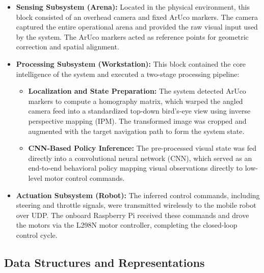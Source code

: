 \begin{itemize}
    \item \textbf{Sensing Subsystem (Arena):}
    Located in the physical environment, this block consisted of an overhead camera and fixed ArUco markers. The camera captured the entire operational arena and provided the raw visual input used by the system. The ArUco markers acted as reference points for geometric correction and spatial alignment.

    \item \textbf{Processing Subsystem (Workstation):}
    This block contained the core intelligence of the system and executed a two-stage processing pipeline:
    \begin{itemize}
        \item \textbf{Localization and State Preparation:}
        The system detected ArUco markers to compute a homography matrix, which warped the angled camera feed into a standardized top-down bird’s-eye view using inverse perspective mapping (IPM). The transformed image was cropped and augmented with the target navigation path to form the system state.

        \item \textbf{CNN-Based Policy Inference:}
        The pre-processed visual state was fed directly into a convolutional neural network (CNN), which served as an end-to-end behavioral policy mapping visual observations directly to low-level motor control commands.
    \end{itemize}

    \item \textbf{Actuation Subsystem (Robot):}
    The inferred control commands, including steering and throttle signals, were transmitted wirelessly to the mobile robot over UDP. The onboard Raspberry Pi received these commands and drove the motors via the L298N motor controller, completing the closed-loop control cycle.
\end{itemize}

\subsection{Data Structures and Representations}
\label{sec:data_structures}

